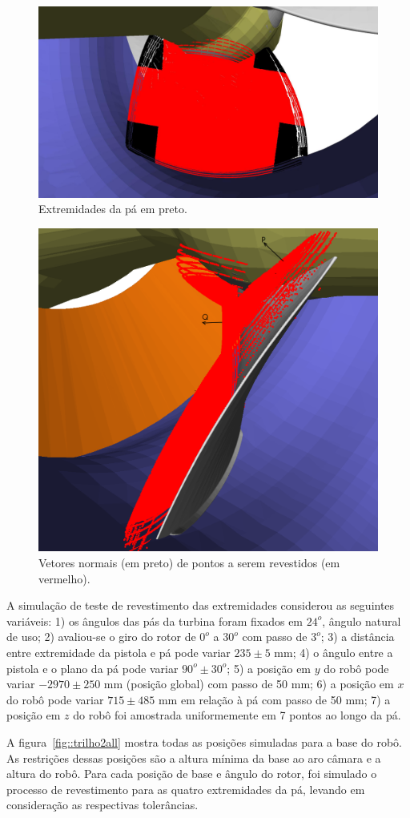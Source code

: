 \begin{figure}[!ht]
	\centering	
	\includegraphics[width=.8\columnwidth]{figs/tocoat.jpg}
	\caption{Extremidades da pá em preto.}
	\label{fig::extremidades}
\end{figure}

\begin{figure}[!ht]
	\centering	
	\includegraphics[width=.5\columnwidth]{figs/normal.png}
	\caption{Vetores normais (em preto) de pontos a serem revestidos (em
	vermelho).}
	\label{fig::normal}
\end{figure}

A simulação de teste de revestimento das extremidades considerou as seguintes
variáveis: 1) os ângulos das pás da turbina foram fixados em $24^o$, ângulo
natural de uso; 2) avaliou-se o giro do rotor de $0^o$ a $30^o$ com passo de
$3^o$; 3) a distância entre extremidade da pistola e pá pode variar $235 \pm 5$
mm; 4) o ângulo entre a pistola e o plano da pá pode variar $90^o \pm 30^o$; 5)
a posição em $y$ do robô pode variar $-2970 \pm 250$ mm (posição global) com
passo de 50 mm; 6) a posição em $x$ do robô pode variar $715 \pm 485$ mm em
relação à pá com passo de 50 mm; 7) a posição em $z$ do robô foi amostrada
uniformemente em 7 pontos ao longo da pá.

A figura~\ref{fig::trilho2all} mostra todas as posições simuladas para a base do
robô. As restrições dessas posições são a altura mínima da base ao aro câmara e
a altura do robô. Para cada posição de base e ângulo do rotor, foi simulado o
processo de revestimento para as quatro extremidades da pá, levando em
consideração as respectivas tolerâncias.

